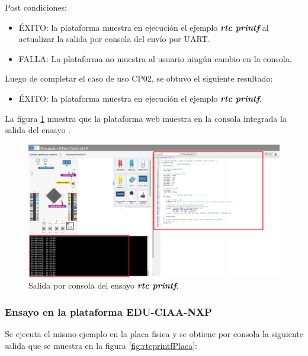 Post condiciones:
\begin{itemize}
	\item ÉXITO: la plataforma muestra en ejecución el ejemplo \textit{\textbf{rtc printf}} al actualizar la salida por consola del envío por UART.
	\item FALLA: La plataforma no muestra al usuario ningún cambio en la consola.
\end{itemize}


Luego de completar el caso de uso CP02, se obtuvo el siguiente resultado: 

\begin{itemize}
	\item ÉXITO: la plataforma muestra en ejecución el ejemplo \textit{\textbf{rtc printf}}.
\end{itemize}


La figura \ref{fig:rtcprintf} muestra que la plataforma web muestra en la consola integrada la salida del ensayo . 

\begin{figure}[ht]
	\centering
	\includegraphics[scale=.21]{./Figures/rtcprintf.png}
	\caption{Salida por consola del ensayo \textit{\textbf{rtc printf}}.}
	\label{fig:rtcprintf}
\end{figure}

\subsubsection{Ensayo en la plataforma EDU-CIAA-NXP} 

Se ejecuta el mismo ejemplo en la placa fisica y se obtiene por consola la siguiente salida que se muestra en la figura \ref{fig:rtcprintfPlaca}:

